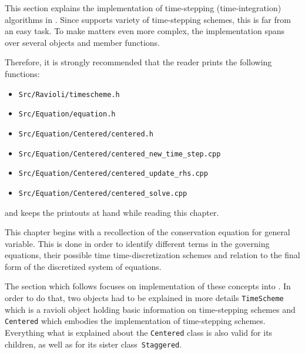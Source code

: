 This section explains the implementation of time-stepping 
(time-integration) algorithms in {\psiboil}. Since {\psiboil} supports variety
of time-stepping schemes, this is far from an easy task. To make matters 
even more complex, the implementation spans over several objects and member 
functions. 

Therefore, it is strongly recommended that the reader prints the following 
functions:
%
\begin{itemize}
  \item {\tt Src/Ravioli/timescheme.h}
  \item {\tt Src/Equation/equation.h}
  \item {\tt Src/Equation/Centered/centered.h}
  \item {\tt Src/Equation/Centered/centered\_new\_time\_step.cpp}
  \item {\tt Src/Equation/Centered/centered\_update\_rhs.cpp}
  \item {\tt Src/Equation/Centered/centered\_solve.cpp}
\end{itemize}
%
and keeps the printouts at hand while reading this chapter.

This chapter begins with a recollection of the conservation equation for 
general variable. This is done in order to identify different terms in the
governing equations, their possible time time-discretization schemes and 
relation to the final form of the discretized system of equations.

The section which follows focuses on implementation of these concepts into
{\psiboil}. In order to do that, two objects had to be explained in more
details {\tt TimeScheme} which is a ravioli object holding basic information
on time-stepping schemes and {\tt Centered} which embodies the implementation
of time-stepping schemes. Everything what is explained about the {\tt Centered}
class is also valid for its children, as well as for its sister 
class~{\tt Staggered}. 
